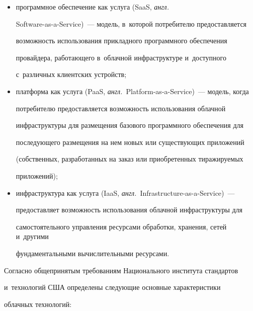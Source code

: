  \begin{itemize}

\item программное обеспечение как услуга (SaaS, \textit{англ.}\  

Software-as-a-Service)~--- модель, в~которой потребителю предоставляется 

возможность использования прикладного программного обеспечения 

провайдера, работающего в~облачной инфраструктуре и~доступного 

с~различных клиентских устройств;

\item платформа как услуга (PaaS, \textit{англ.}\ Platform-as-a-Service)~--- модель, когда 

потребителю предоставляется возможность использования облачной 

\mbox{инфраструктуры} для размещения базового программного обеспечения для 

последующего размещения на нем новых или существующих приложений 

(собственных, разработанных на заказ или приобретенных тиражируемых 

приложений);

\item инфраструктура как услуга (IaaS, \textit{англ.}\ Infrastructure-as-a-Service)~--- 

предо\-став\-ля\-ет возможность использования облачной инфраструктуры для 

самостоятельного управления ресурсами обработки, хранения, сетей и~другими 

фундаментальными вычислительными ресурсами.

\end{itemize}



  Согласно общепринятым требованиям Национального института стандартов 

и~технологий США определены следующие основные характеристики 

облачных технологий:

